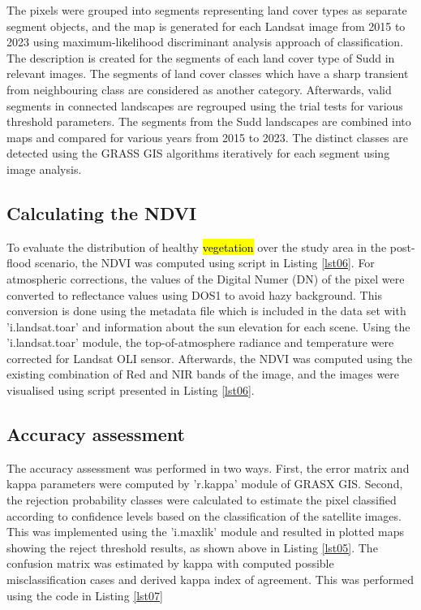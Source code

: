 \documentclass[analytics,article,submit,pdftex,moreauthors]{Definitions/mdpi}
\begin{document}
The pixels were grouped into segments representing land cover types as separate segment objects, and the map is generated for each Landsat image from 2015 to 2023 using maximum-likelihood discriminant analysis approach of classification. The description is created for the segments of each land cover type of Sudd in relevant images. The segments of land cover classes which have a sharp transient from neighbouring class are considered as another category. Afterwards, valid segments in connected landscapes are regrouped using the trial tests for various threshold parameters. The segments from the Sudd landscapes are combined into maps and compared for various years from 2015 to 2023. The distinct classes are detected using the GRASS GIS algorithms iteratively for each segment using image analysis.

\subsection{Calculating the NDVI}

To evaluate the distribution of healthy \hl{vegetation} over the study area in the post-flood scenario, the NDVI was computed using script in Listing \ref{lst06}. For atmospheric corrections, the values of the Digital Numer (DN) of the pixel were converted to reflectance values using DOS1 to avoid hazy background. This conversion is done using the metadata file which is included in the data set with 'i.landsat.toar' and information about the sun elevation for each scene. Using the 'i.landsat.toar' module, the top-of-atmosphere radiance and temperature were corrected for Landsat OLI sensor. Afterwards, the NDVI was computed using the existing combination of Red and NIR bands of the image, and the images were visualised using script presented in Listing \ref{lst06}. 

\subsection{Accuracy assessment}

The accuracy assessment was performed in two ways. First, the error matrix and kappa parameters were computed by 'r.kappa' module of GRASX GIS. Second, the rejection probability classes were calculated to estimate the pixel classified according to confidence levels based on the classification of the satellite images. This was implemented using the 'i.maxlik' module and resulted in plotted maps showing the reject threshold results, as shown above in Listing \ref{lst05}. The confusion matrix was estimated by kappa with computed possible misclassification cases and derived kappa index of agreement. This was performed using the code in Listing \ref{lst07}
\end{document}
